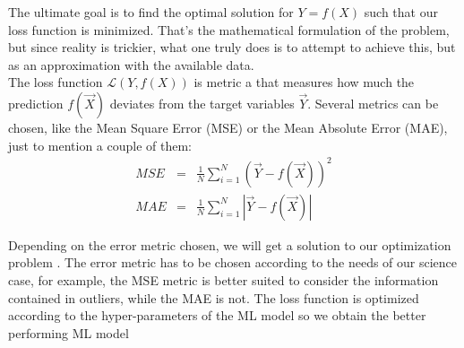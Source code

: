 The ultimate goal is to find the optimal solution for $Y = f(X)$ such that our loss function is minimized. That's the mathematical formulation of the problem, but since reality is trickier, what one truly does is to attempt to achieve this, but as an approximation with the available data.\\

The loss function $\mathcal{L}(Y,f(X))$ is metric a that measures how much the prediction $f(\vec{X})$ deviates from the target variables $\vec{Y}$. Several metrics can be chosen, like the Mean Square Error (MSE) or the Mean Absolute Error (MAE), just to mention a couple of them:
\begin{eqnarray*}
MSE &=& \frac{1}{N} \sum_{i=1}^{N}\left( \vec{Y} - f(\vec{X})\right)^2\\
MAE &=& \frac{1}{N} \sum_{i=1}^{N}\left| \vec{Y} - f(\vec{X})\right|
\end{eqnarray*}

Depending on the error metric chosen, we will get a solution to our optimization problem \cite{Hastie2003}. The error metric has to be chosen according to the needs of our science case, for example, the MSE metric is better suited to consider the information contained in outliers, while the MAE is not. The loss function is optimized according to the hyper-parameters of the ML model so we obtain the better performing ML model \cite{Baron2019}
